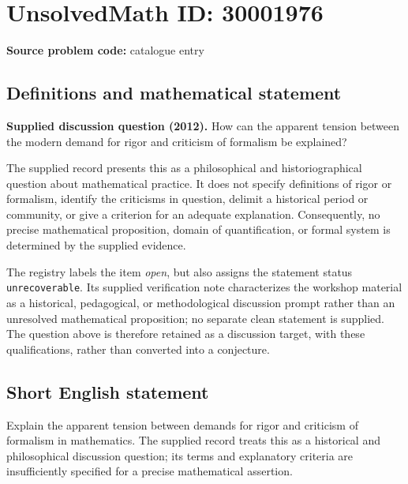 \documentclass[11pt]{article}
\begin{document}
\section*{UnsolvedMath ID: 30001976}
\textbf{Source problem code:} catalogue entry
\subsection{Definitions and mathematical statement}
\textbf{Supplied discussion question (2012).} How can the apparent tension between the modern demand for rigor and criticism of formalism be explained?

The supplied record presents this as a philosophical and historiographical question about mathematical practice. It does not specify definitions of rigor or formalism, identify the criticisms in question, delimit a historical period or community, or give a criterion for an adequate explanation. Consequently, no precise mathematical proposition, domain of quantification, or formal system is determined by the supplied evidence.

The registry labels the item \emph{open}, but also assigns the statement status \texttt{unrecoverable}. Its supplied verification note characterizes the workshop material as a historical, pedagogical, or methodological discussion prompt rather than an unresolved mathematical proposition; no separate clean statement is supplied. The question above is therefore retained as a discussion target, with these qualifications, rather than converted into a conjecture.
\subsection{Short English statement}
Explain the apparent tension between demands for rigor and criticism of formalism in mathematics. The supplied record treats this as a historical and philosophical discussion question; its terms and explanatory criteria are insufficiently specified for a precise mathematical assertion.
\end{document}
